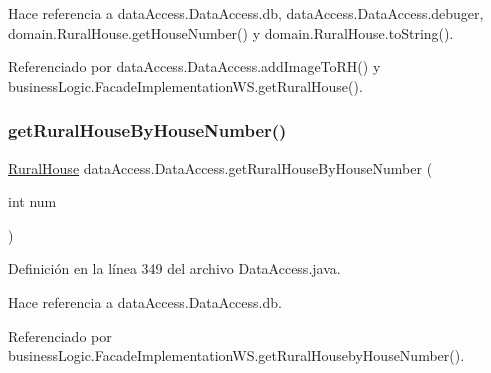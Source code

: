 Hace referencia a data\+Access.\+Data\+Access.\+db, data\+Access.\+Data\+Access.\+debuger, domain.\+Rural\+House.\+get\+House\+Number() y domain.\+Rural\+House.\+to\+String().



Referenciado por data\+Access.\+Data\+Access.\+add\+Image\+To\+R\+H() y business\+Logic.\+Facade\+Implementation\+W\+S.\+get\+Rural\+House().

\mbox{\label{classdata_access_1_1_data_access_a652083447d2e9e5fd5b6228bc67a8ca4}} 
\subsubsection{\texorpdfstring{getRuralHouseByHouseNumber()}{getRuralHouseByHouseNumber()}}
{\footnotesize\ttfamily \mbox{\hyperlink{classdomain_1_1_rural_house}{Rural\+House}} data\+Access.\+Data\+Access.\+get\+Rural\+House\+By\+House\+Number (\begin{DoxyParamCaption}\item[{int}]{num }\end{DoxyParamCaption})}



Definición en la línea 349 del archivo Data\+Access.\+java.


\begin{DoxyCode}{0}

\end{DoxyCode}


Hace referencia a data\+Access.\+Data\+Access.\+db.



Referenciado por business\+Logic.\+Facade\+Implementation\+W\+S.\+get\+Rural\+Houseby\+House\+Number().

\mbox{\label{classdata_access_1_1_data_access_ab4e4324392bb85a0f2a2c209f463d1fa}} 
